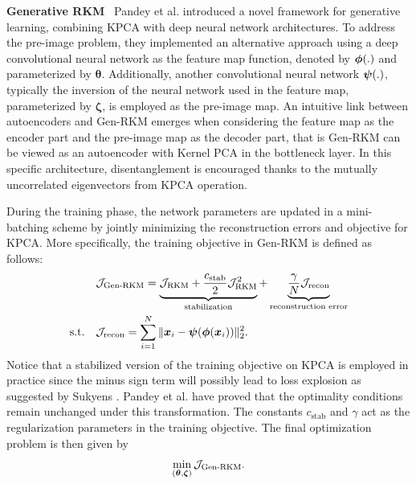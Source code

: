 \noindent\textbf{Generative RKM} \ Pandey et al. \cite{pandeyGenerativeRestrictedKernel2021} introduced a novel framework for generative learning, combining KPCA with deep neural network architectures.  To address the pre-image problem, they implemented an alternative approach using a deep convolutional neural network as the feature map function, denoted by $\boldsymbol{\phi}(.)$ and parameterized by $\boldsymbol{\theta}$. Additionally, another convolutional neural network $\boldsymbol{\psi}(.)$, typically the inversion of the neural network used in the feature map, parameterized by $\boldsymbol{\zeta}$, is employed as the pre-image map. An intuitive link between autoencoders and Gen-RKM emerges when considering the feature map as the encoder part and the pre-image map as the decoder part, that is Gen-RKM can be viewed as an autoencoder with Kernel PCA in the bottleneck layer. In this specific architecture, disentanglement is encouraged thanks to the mutually uncorrelated eigenvectors from KPCA operation.

During the training phase, the network parameters are updated in a mini-batching scheme by jointly minimizing the reconstruction errors and objective for KPCA. More specifically, the training objective in Gen-RKM is defined as follows:
\begin{equation}
    \begin{aligned}
 &\mathcal{J}_{\text{Gen-RKM}} = \underbrace{\mathcal{J}_{\text{RKM}} + \frac{c_{\text{stab}}}{2}\mathcal{J}_{\text{RKM}}^2}_{\text{stabilization}} + \underbrace{\frac{\gamma}
        {N}\mathcal{J}_{\text{recon}}}_{\text{reconstruction error}} \\
        \text{s.t.}\quad & \mathcal{J}_{\text{recon}} = \sum_{i=1}^{N}\|\boldsymbol{x}_i - \boldsymbol{\psi}(\boldsymbol{\phi}(\boldsymbol{x}_i)) \|_2^2.
    \end{aligned}
    \label{Gen-RKM-stab-obj}
\end{equation}
Notice that a stabilized version of the training objective on KPCA is employed in practice since the minus sign term will possibly lead to loss explosion as suggested by Sukyens \cite{suykensDeepRestrictedKernel2017}. Pandey et al. \cite{pandeyGenerativeRestrictedKernel2021} have proved that the optimality conditions remain unchanged under this transformation. The constants $c_{\text{stab}}$ and $\gamma$ act as the regularization parameters in the training objective. The final optimization problem is then given by
\begin{equation}
    \min_{(\boldsymbol{\theta},\boldsymbol{\zeta})} \mathcal{J}_{\text{Gen-RKM}}.
\end{equation}

